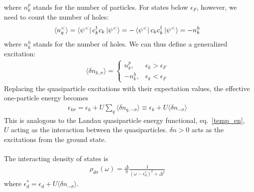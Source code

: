 \documentclass[twoside]{report}
\numberwithin{equation}{section}
\begin{document}
where \(n^p_k\) stands for the number of particles.
For states below \(\epsilon_F\), however, we need to count the number of holes:
\begin{equation}\begin{aligned}
	\langle  n_q^<\rangle = \bra{\psi^<}c^\dagger_k c_k\ket{\psi^<} = -\bra{\psi^<}c_k c^\dagger_k \ket{\psi^<} = -n^h_k
\end{aligned}\end{equation}
where \(n^h_k\) stands for the number of holes.
We can thus define a generalized excitation:
\begin{equation}\begin{aligned}
	\langle \delta n_{k,\sigma}\rangle = \begin{cases} n^p_k, &\epsilon_k > \epsilon_F\\ -n^h_k, &\epsilon_k < \epsilon_F\end{cases}
\end{aligned}\end{equation}
Replacing the quasiparticle excitations with their expectation values, the effective one-particle energy becomes
\begin{equation}\begin{aligned}
	\epsilon_{k\sigma} = \epsilon_k + U\sum_q \langle \delta n_{q,-\sigma}\rangle \equiv \epsilon_k + U\langle \delta n_{-\sigma}\rangle
\end{aligned}\end{equation}
This is analogous to the Landau quasiparticle energy functional, eq.~\ref{temp_en}, \(U\) acting as the interaction between the quasiparticles.
\(\delta n > 0\) acts as the excitations from the ground state.
\\\\
The interacting density of states is
\begin{equation}\begin{aligned}
	\label{dosint}
	\rho_{d\sigma}(\omega) = \frac{\Delta}{\pi}\frac{1}{\left(\omega - \epsilon_d^*\right)^2 + \Delta^2}
\end{aligned}\end{equation}
where \(\epsilon_d^* = \epsilon_d + U\langle \delta n_{-\sigma}\rangle\).
\end{document}
